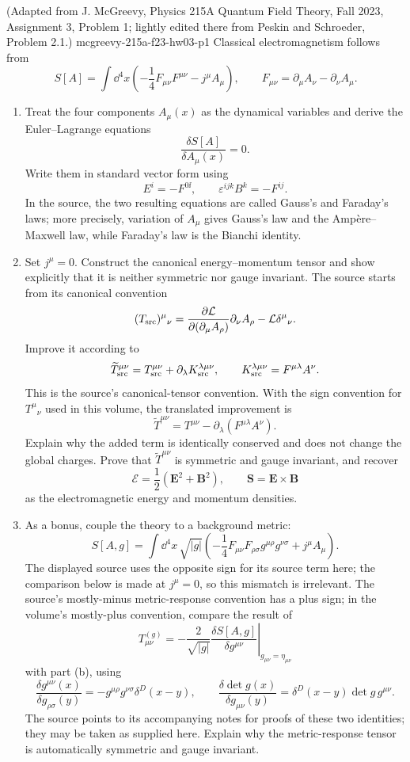 \begin{enumerate}
  {(Adapted from J. McGreevy, Physics 215A Quantum Field Theory, Fall 2023, Assignment 3, Problem 1; lightly edited there from Peskin and Schroeder, Problem 2.1.)}
  {mcgreevy-215a-f23-hw03-p1}
Classical electromagnetism follows from
\[
 S[A]=\int \dd^4x\left(
 -\frac14F_{\mu\nu}F^{\mu\nu}-j^\mu A_\mu\right),
\qquad
 F_{\mu\nu}=\partial_\mu A_\nu-\partial_\nu A_\mu.
\]
\begin{enumerate}
\item
Treat the four components \(A_\mu(x)\) as the dynamical variables and
derive the Euler--Lagrange equations
\[
 \frac{\delta S[A]}{\delta A_\mu(x)}=0.
\]
Write them in standard vector form using
\[
 E^i=-F^{0\ii},\qquad
 \varepsilon^{ijk}B^k=-F^{ij}.
\]
In the source, the two resulting equations are called Gauss's and
Faraday's laws; more precisely, variation of \(A_\mu\) gives Gauss's
law and the Amp\`ere--Maxwell law, while Faraday's law is the Bianchi
identity.
\item
Set \(j^\mu=0\).  Construct the canonical energy--momentum tensor and
show explicitly that it is neither symmetric nor gauge invariant.
The source starts from its canonical convention
\[
 (T_{\rm src})^\mu{}_\nu
 =\frac{\partial\mathcal L}
        {\partial(\partial_\mu A_\rho)}
   \partial_\nu A_\rho-\mathcal L\delta^\mu{}_\nu.
\]
Improve it according to
\[
 \widetilde T_{\rm src}^{\mu\nu}
 =T_{\rm src}^{\mu\nu}+\partial_\lambda K_{\rm src}^{\lambda\mu\nu},
\qquad
 K_{\rm src}^{\lambda\mu\nu}=F^{\mu\lambda}A^\nu.
\]
This is the source's canonical-tensor convention.  With the sign
convention for \(T^\mu{}_\nu\) used in this volume, the translated
improvement is
\[
 \widetilde T^{\mu\nu}
 =T^{\mu\nu}-\partial_\lambda
 \left(F^{\mu\lambda}A^\nu\right).
\]
Explain why the added term is identically conserved and does not change
the global charges.  Prove that \(\widetilde T^{\mu\nu}\) is symmetric
and gauge invariant, and recover
\[
 \mathcal E=\frac12(\mathbf E^2+\mathbf B^2),
\qquad
 \mathbf S=\mathbf E\times\mathbf B
\]
as the electromagnetic energy and momentum densities.
\item
As a bonus, couple the theory to a background metric:
\[
 S[A,g]=\int \dd^4x\,\sqrt{|g|}
 \left(-\frac14F_{\mu\nu}F_{\rho\sigma}
 g^{\mu\rho}g^{\nu\sigma}+j^\mu A_\mu\right).
\]
The displayed source uses the opposite sign for its source term here;
the comparison below is made at \(j^\mu=0\), so this mismatch is
irrelevant.  The source's mostly-minus metric-response convention has
a plus sign; in the volume's mostly-plus convention, compare the result
of
\[
 T^{(g)}_{\mu\nu}
 =\left.-\frac{2}{\sqrt{|g|}}
 \frac{\delta S[A,g]}{\delta g^{\mu\nu}}\right|_{g_{\mu\nu}=\eta_{\mu\nu}}
\]
with part (b), using
\[
 \frac{\delta g^{\mu\nu}(x)}{\delta g_{\rho\sigma}(y)}
 =-g^{\mu\rho}g^{\nu\sigma}\delta^D(x-y),
\qquad
 \frac{\delta\det g(x)}{\delta g_{\mu\nu}(y)}
 =\delta^D(x-y)\det g\,g^{\mu\nu}.
\]
The source points to its accompanying notes for proofs of these two
identities; they may be taken as supplied here.
Explain why the metric-response tensor is automatically symmetric and
gauge invariant.
\end{enumerate}


\end{enumerate}
